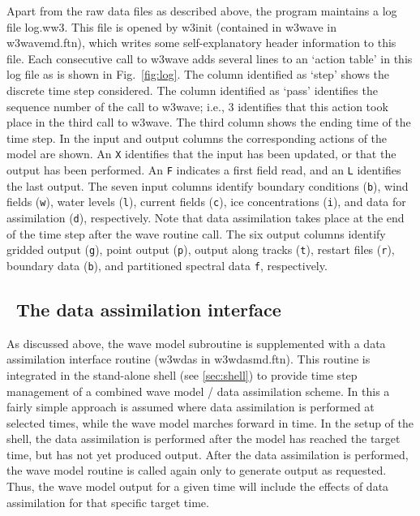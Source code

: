  

Apart from the raw data files as described above, the program maintains a log
file {\file log.ww3}. This file is opened by {\F w3init} (contained in {\F
w3wave} in {\file w3wavemd.ftn}), which writes some self-explanatory header
information to this file. Each consecutive call to {\F w3wave} adds several
lines to an `action table' in this log file as is shown in
Fig.~\ref{fig:log}. The column identified as `step' shows the discrete time
step considered. The column identified as `pass' identifies the sequence
number of the call to {\F w3wave}; i.e., 3 identifies that this action took
place in the third call to {\F w3wave}. The third column shows the ending time
of the time step. In the input and output columns the corresponding actions of
the model are shown. An {\tt X} identifies that the input has been updated, or
that the output has been performed. An {\tt F} indicates a first field read,
and an {\tt L} identifies the last output. The seven input columns identify
boundary conditions ({\tt b}), wind fields ({\tt w}), water levels ({\tt l}),
current fields ({\tt c}), ice concentrations ({\tt i}), and data for
assimilation ({\tt d}), respectively. Note that data assimilation takes place
at the end of the time step after the wave routine call. The six output
columns identify gridded output ({\tt g}), point output ({\tt p}), output
along tracks ({\tt t}), restart files ({\tt r}), boundary data ({\tt b}), and
partitioned spectral data {\tt f}, respectively. 


\vssub
\subsection{~The data assimilation interface} \label{sec:das}
\vssub

As discussed above, the wave model subroutine is supplemented with a data
assimilation interface routine ({\F w3wdas} in {\file w3wdasmd.ftn}). This
routine is integrated in the stand-alone shell (see \para\ref{sec:shell}) to
provide time step management of a combined wave model / data assimilation
scheme. In this a fairly simple approach is assumed where data assimilation is
performed at selected times, while the wave model marches forward in time. In
the setup of the shell, the data assimilation is performed after the model has
reached the target time, but has not yet produced output. After the data
assimilation is performed, the wave model routine is called again only to
generate output as requested. Thus, the wave model output for a given time
will include the effects of data assimilation for that specific target time.

